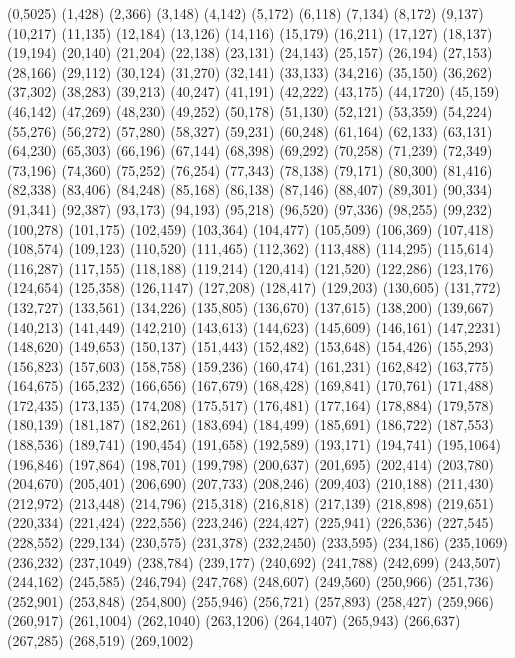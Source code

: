(0,5025)
(1,428)
(2,366)
(3,148)
(4,142)
(5,172)
(6,118)
(7,134)
(8,172)
(9,137)
(10,217)
(11,135)
(12,184)
(13,126)
(14,116)
(15,179)
(16,211)
(17,127)
(18,137)
(19,194)
(20,140)
(21,204)
(22,138)
(23,131)
(24,143)
(25,157)
(26,194)
(27,153)
(28,166)
(29,112)
(30,124)
(31,270)
(32,141)
(33,133)
(34,216)
(35,150)
(36,262)
(37,302)
(38,283)
(39,213)
(40,247)
(41,191)
(42,222)
(43,175)
(44,1720)
(45,159)
(46,142)
(47,269)
(48,230)
(49,252)
(50,178)
(51,130)
(52,121)
(53,359)
(54,224)
(55,276)
(56,272)
(57,280)
(58,327)
(59,231)
(60,248)
(61,164)
(62,133)
(63,131)
(64,230)
(65,303)
(66,196)
(67,144)
(68,398)
(69,292)
(70,258)
(71,239)
(72,349)
(73,196)
(74,360)
(75,252)
(76,254)
(77,343)
(78,138)
(79,171)
(80,300)
(81,416)
(82,338)
(83,406)
(84,248)
(85,168)
(86,138)
(87,146)
(88,407)
(89,301)
(90,334)
(91,341)
(92,387)
(93,173)
(94,193)
(95,218)
(96,520)
(97,336)
(98,255)
(99,232)
(100,278)
(101,175)
(102,459)
(103,364)
(104,477)
(105,509)
(106,369)
(107,418)
(108,574)
(109,123)
(110,520)
(111,465)
(112,362)
(113,488)
(114,295)
(115,614)
(116,287)
(117,155)
(118,188)
(119,214)
(120,414)
(121,520)
(122,286)
(123,176)
(124,654)
(125,358)
(126,1147)
(127,208)
(128,417)
(129,203)
(130,605)
(131,772)
(132,727)
(133,561)
(134,226)
(135,805)
(136,670)
(137,615)
(138,200)
(139,667)
(140,213)
(141,449)
(142,210)
(143,613)
(144,623)
(145,609)
(146,161)
(147,2231)
(148,620)
(149,653)
(150,137)
(151,443)
(152,482)
(153,648)
(154,426)
(155,293)
(156,823)
(157,603)
(158,758)
(159,236)
(160,474)
(161,231)
(162,842)
(163,775)
(164,675)
(165,232)
(166,656)
(167,679)
(168,428)
(169,841)
(170,761)
(171,488)
(172,435)
(173,135)
(174,208)
(175,517)
(176,481)
(177,164)
(178,884)
(179,578)
(180,139)
(181,187)
(182,261)
(183,694)
(184,499)
(185,691)
(186,722)
(187,553)
(188,536)
(189,741)
(190,454)
(191,658)
(192,589)
(193,171)
(194,741)
(195,1064)
(196,846)
(197,864)
(198,701)
(199,798)
(200,637)
(201,695)
(202,414)
(203,780)
(204,670)
(205,401)
(206,690)
(207,733)
(208,246)
(209,403)
(210,188)
(211,430)
(212,972)
(213,448)
(214,796)
(215,318)
(216,818)
(217,139)
(218,898)
(219,651)
(220,334)
(221,424)
(222,556)
(223,246)
(224,427)
(225,941)
(226,536)
(227,545)
(228,552)
(229,134)
(230,575)
(231,378)
(232,2450)
(233,595)
(234,186)
(235,1069)
(236,232)
(237,1049)
(238,784)
(239,177)
(240,692)
(241,788)
(242,699)
(243,507)
(244,162)
(245,585)
(246,794)
(247,768)
(248,607)
(249,560)
(250,966)
(251,736)
(252,901)
(253,848)
(254,800)
(255,946)
(256,721)
(257,893)
(258,427)
(259,966)
(260,917)
(261,1004)
(262,1040)
(263,1206)
(264,1407)
(265,943)
(266,637)
(267,285)
(268,519)
(269,1002)
